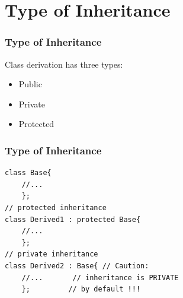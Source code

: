 \documentclass{beamer}
\newtheorem{Key points}{Key points}
\begin{document}
\section{Type of Inheritance}
\begin{frame}[fragile]
\frametitle{Type of Inheritance}
Class derivation has three types:
\begin{itemize}
\item Public 
\item Private
\item Protected
\end{itemize}
\end{frame}
\begin{frame}[fragile]
\frametitle{Type of Inheritance}
\begin{lstlisting}
class Base{
	//...
	};
// protected inheritance
class Derived1 : protected Base{
	//...
	};
// private inheritance
class Derived2 : Base{ // Caution:
	//...       // inheritance is PRIVATE
	};         // by default !!!
\end{lstlisting}
\end{frame}
\end{document}
